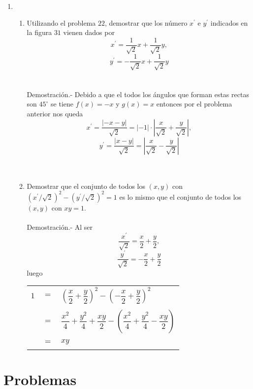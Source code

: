 \begin{enumerate}[\bfseries 1.]
    \item 
    \begin{enumerate}[\bfseries (a)]
	
	\item Utilizando el problema $22$, demostrar que los número $x^{'}$ e $y^{'}$ indicados en la figura $31$ vienen dados por $$x^{'} = \dfrac{1}{\sqrt{2}}x + \dfrac{1}{\sqrt{2}}y,$$ $$y^{'}= - \dfrac{1}{\sqrt{2}}x + \dfrac{1}{\sqrt{2}}y$$\\\\
	    Demostración.-\; Debido a que el todos los ángulos que forman estas rectas son $45^{\circ}$ se tiene $f(x)=-x$ y $g(x)=x$ entonces por el problema anterior nos queda $$x^{'}=\dfrac{|-x-y|}{\sqrt{2}} = |-1|\cdot \left| \dfrac{x}{\sqrt{2}} + \dfrac{y}{\sqrt{2}}\right|,$$ $$y^{'} = \dfrac{|x-y|}{\sqrt{2}}= \left|\dfrac{x}{\sqrt{2}} - \dfrac{y}{\sqrt{2}}\right|$$\\\\

	\item Demostrar que el conjunto de todos los $(x,y)$ con $(x^{'} / \sqrt{2})^2 - (y^{'}/\sqrt{2})^2 = 1$ es lo mismo que el conjunto de todos los $(x,y)$ con $xy=1$.\\\\
	    Demostración.-\; Al ser $$\dfrac{x^{'}}{\sqrt{2}} = \dfrac{x}{2} + \dfrac{y}{2},$$ $$\dfrac{y^{'}}{\sqrt{2}}=-\dfrac{x}{2}+\dfrac{y}{2}$$ luego 
	    \begin{center}
		\begin{tabular}{ccl}
		    $1$&$=$&$\left( \dfrac{x}{2} + \dfrac{y}{2} \right)^2 - \left( - \dfrac{x}{2} + \dfrac{y}{2} \right)^2$\\\\
		    &$=$&$\dfrac{x^2}{4} + \dfrac{y^2}{4} + \dfrac{xy}{2} - \left( \dfrac{x^2}{4} + \dfrac{y^2}{4} - \dfrac{xy}{2} \right)$\\\\
		    &$=$&$xy$\\\\
		\end{tabular}
	    \end{center}
	    
    \end{enumerate}

\end{enumerate}

\section{Problemas}

